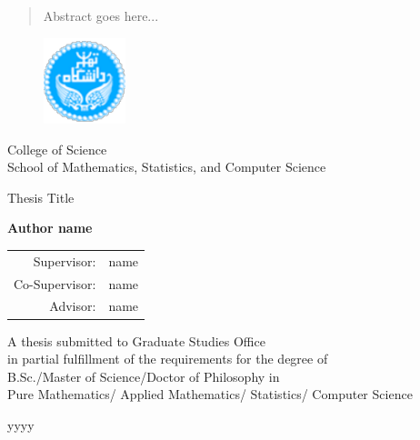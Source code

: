 \documentclass[12pt]{report}
\begin{document}
\begin{latin}
\begin{abstract}
Abstract goes here...
\end{abstract}
\newpage

\begin{figure}
\centering
\includegraphics[height=2.5cm]{UT-Logo.pdf}
\end{figure}
\begin{center}

College of Science\\
School of Mathematics, Statistics, and Computer Science
\end{center}

\begin{center}
\end{center}

\begin{center}
\huge{Thesis Title}
\end{center}

\begin{center}
\end{center}

\begin{center}
\textbf{
Author name
}
\end{center}

\begin{center}
\begin{tabular}{rr}
Supervisor: & name\\
Co-Supervisor: & name\\
Advisor: & name
\end{tabular}
\end{center}

\vspace{3cm}
\begin{center}
A thesis submitted to Graduate Studies Office\\
in partial fulfillment of the requirements for the degree of \\
B.Sc./Master of Science/Doctor of Philosophy in\\
Pure Mathematics/ Applied Mathematics/ Statistics/ Computer Science
\end{center}

\begin{center}
yyyy
\end{center}


\end{latin}
\end{document}
